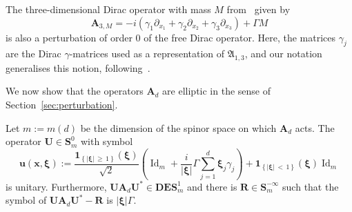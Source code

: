 \documentclass[10pt]{amsart}
\theoremstyle{definition}\newtheorem{defi}[theo]{Definition}\newtheorem{rema}[theo]{Remark}\newtheorem{exam}[theo]{Example}\newtheorem{nota}[theo]{Notation}
\DeclareMathOperator{\Id}{Id}
\newcommand{\bxi}{\boldsymbol \xi}
\newcommand{\bone}{\boldsymbol 1}
\newcommand{\BA}{\mathbf A}
\newcommand{\BD}{\mathbf D}
\newcommand{\BE}{\mathbf E}
\newcommand{\BS}{\mathbf S}
\newcommand{\BR}{\mathbf R}
\newcommand{\BU}{\mathbf U}
\newcommand{\bx}{\mathbf x}
\newcommand{\bu}{\mathbf u}
\newcommand{\FA}{\mathfrak A}
\newcommand{\del}{\partial}
\newcommand{\abs}[1]{\left\lvert #1 \right\rvert}
\newcommand{\set}[1]{\left\{ #1 \right\}}
\begin{document}
\begin{exem}
The three-dimensional Dirac operator with mass $M$ from~\cite[Equation 1.11]{thaller} given by
\begin{equation}
\BA_{3,M} = -i\left(\gamma_1 \del_{x_1} + \gamma_2 \del_{x_2} + \gamma_3
\del_{x_3}\right) + \Gamma M
\end{equation}
is also a perturbation of order $0$ of the free Dirac operator. Here, the matrices $\gamma_j$ are the Dirac $\gamma$-matrices used as a representation of $\FA_{1,3}$, and our notation generalises this notion, following~\cite{Upmeier}.
\end{exem}

We now show that the operators $\BA_d$ are elliptic in the sense of Section~\ref{sec:perturbation}.

\begin{prop}\label{prop:diagdirac}
Let $m:= m(d)$ be the dimension of the spinor space on which $\BA_d$ acts. The operator $\BU \in \BS^0_m$ with symbol
\begin{equation}\label{eq:explicitunitary}
\bu(\bx,\bxi) := \frac{\bone_{\set{\abs \bxi\,\ge\,1}}(\bxi)}{\sqrt 2}\left(\Id_m + \frac{i}{\abs \bxi} \Gamma
\sum_{j=1}^d \bxi_j \gamma_j\right)+
\bone_{\set{\abs{\bxi}\,<\,1}}(\bxi)\Id_m
\end{equation}
is unitary. Furthermore, $\BU \BA_d \BU^* \in \BD\BE\BS_m^1$ and there is $\BR
\in \BS_m^{-\infty}$ such that the symbol of $\BU \BA_d \BU^* - \BR$ is $\abs{\bxi} \Gamma$.
\end{prop}
\end{document}
